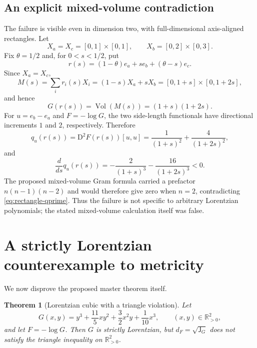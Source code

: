 \documentclass[11pt]{article}
\newtheorem{theorem}{Theorem}[section]
\theoremstyle{definition}
\newcommand{\R}{\mathbb{R}}
\newcommand{\J}{\mathsf{J}}
\newcommand{\Vol}{\operatorname{Vol}}
\newcommand{\D}{\mathrm{D}}
\begin{document}
\subsection{An explicit mixed-volume contradiction}

The failure is visible even in dimension two, with full-dimensional axis-aligned rectangles.
Let
\[
 X_a=X_c=[0,1]\times[0,1],
 \qquad
 X_b=[0,2]\times[0,3].
\]
Fix $\theta=1/2$ and, for $0<s<1/2$, put
\[
 r(s)=(1-\theta)e_a+s e_b+(\theta-s)e_c.
\]
Since $X_a=X_c$,
\[
 M(s)=\sum_i r_i(s)X_i=(1-s)X_a+sX_b
      =[0,1+s]\times[0,1+2s],
\]
and hence
\[
 G(r(s))=\Vol(M(s))=(1+s)(1+2s).
\]
For $u=e_b-e_a$ and $F=-\log G$, the two side-length functionals have directional
increments $1$ and $2$, respectively.  Therefore
\begin{equation}\label{eq:rectangle-q}
 q_u(r(s))=\D^2F(r(s))[u,u]
 =\frac{1}{(1+s)^2}+\frac{4}{(1+2s)^2},
\end{equation}
and
\begin{equation}\label{eq:rectangle-qprime}
 \frac{d}{ds}q_u(r(s))
 =-\frac{2}{(1+s)^3}-\frac{16}{(1+2s)^3}<0.
\end{equation}
The proposed mixed-volume Gram formula carried a prefactor $n(n-1)(n-2)$ and would
therefore give zero when $n=2$, contradicting \eqref{eq:rectangle-qprime}.  Thus the
failure is not specific to arbitrary Lorentzian polynomials; the stated mixed-volume
calculation itself was false.

\section{A strictly Lorentzian counterexample to metricity}

We now disprove the proposed master theorem itself.

\begin{theorem}[Lorentzian cubic with a triangle violation]\label{thm:lorentzian-counterexample}
Let
\begin{equation}\label{eq:cubic}
 G(x,y)=y^3+\frac{11}{5}xy^2+\frac32x^2y+\frac1{10}x^3,
 \qquad (x,y)\in\R_{>0}^2,
\end{equation}
and let $F=-\log G$.  Then $G$ is strictly Lorentzian, but
$d_F=\sqrt{\J_G}$ does not satisfy the triangle inequality on $\R_{>0}^2$.
\end{theorem}
\end{document}
